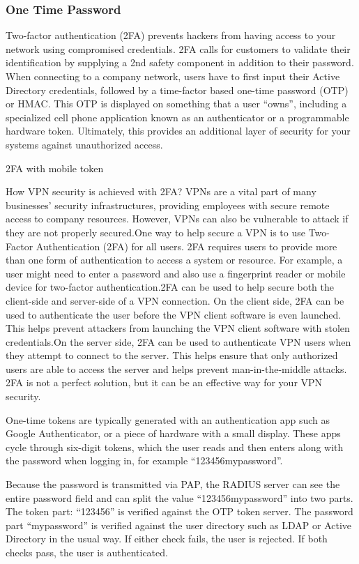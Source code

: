 \subsubsection{One Time Password}
Two-factor authentication (2FA) prevents hackers from having access to your network using compromised credentials. 2FA calls for customers to validate their identification by supplying a 2nd safety component in addition to their password. When connecting to a company network, users have to first input their Active Directory credentials, followed by a time-factor based one-time password (OTP) or HMAC. This OTP is displayed on something that a user “owns”, including a specialized cell phone application known as an authenticator or a programmable hardware token. Ultimately, this provides an additional layer of security for your systems against unauthorized access.

2FA with mobile token

How VPN security is achieved with 2FA?
VPNs are a vital part of many businesses' security infrastructures, providing employees with secure remote access to company resources. However, VPNs can also be vulnerable to attack if they are not properly secured.One way to help secure a VPN is to use Two-Factor Authentication (2FA) for all users. 2FA requires users to provide more than one form of authentication to access a system or resource. For example, a user might need to enter a password and also use a fingerprint reader or mobile device for two-factor authentication.2FA can be used to help secure both the client-side and server-side of a VPN connection. On the client side, 2FA can be used to authenticate the user before the VPN client software is even launched. This helps prevent attackers from launching the VPN client software with stolen credentials.On the server side, 2FA can be used to authenticate VPN users when they attempt to connect to the server. This helps ensure that only authorized users are able to access the server and helps prevent man-in-the-middle attacks. 2FA is not a perfect solution, but it can be an effective way for your VPN security.

One-time tokens are typically generated with an authentication app such as Google Authenticator, or a piece of hardware with a small display. These apps cycle through six-digit tokens, which the user reads and then enters along with the password when logging in, for example “123456mypassword”.

Because the password is transmitted via PAP, the RADIUS server can see the entire password field and can split the value “123456mypassword” into two parts. The token part: “123456” is verified against the OTP token server. The password part “mypassword” is verified against the user directory such as LDAP or Active Directory in the usual way. If either check fails, the user is rejected. If both checks pass, the user is authenticated.



